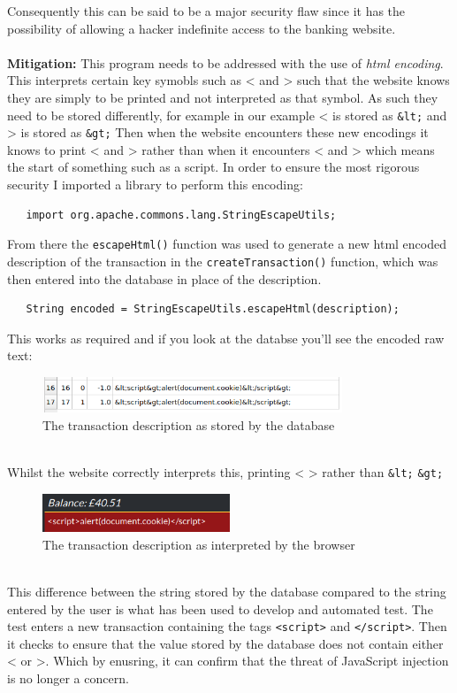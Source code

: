 Consequently this can be said to be a major security flaw since it has the possibility of allowing a hacker indefinite access to the banking website.\\ \\
\textbf{Mitigation:} This program needs to be addressed with the use of \textit{html encoding}. This interprets certain key symobls such as < and > such that the website knows
they are simply to be printed and not interpreted as that symbol. As such they need to be stored differently, for example in our example < is stored as \verb|&lt;| and > is stored as
\verb|&gt;| Then when the website encounters these new encodings it knows to print < and > rather than when it encounters < and > which means the start of something such as a
script. In order to ensure the most rigorous security I imported a library to perform this encoding:
\begin{verbatim}
   import org.apache.commons.lang.StringEscapeUtils;
\end{verbatim}
From there the \verb|escapeHtml()| function was used to generate a new html encoded description of the transaction in the \verb|createTransaction()| function, which was then
entered into the database in place of the description.
\begin{verbatim}
   String encoded = StringEscapeUtils.escapeHtml(description);
\end{verbatim}
This works as required and if you look at the databse you'll see the encoded raw text:
\begin{figure}[h]
   \centering
   \includegraphics[width=0.8\textwidth]{figs/database.png}
   \caption{The transaction description as stored by the database}
   \label{fig2}
\end{figure}\\
Whilst the website correctly interprets this, printing < > rather than \verb|&lt;| \verb|&gt;|
\begin{figure}[h]
   \centering
   \includegraphics[width=0.5\textwidth]{figs/websitejs.png}
   \caption{The transaction description as interpreted by the browser}
   \label{fig3}
\end{figure}\\
This difference between the string stored by the database compared to the string entered by the user is what has been used to develop and automated test. The test enters a new
transaction containing the tags \verb|<script>| and \verb|</script>|. Then it checks to ensure that the value stored by the database does not contain either < or >. Which by
enusring, it can confirm that the threat of JavaScript injection is no longer a concern.
 
